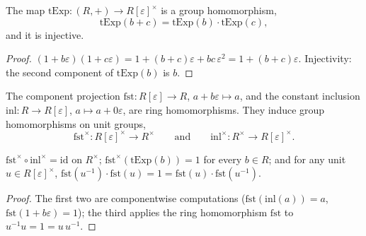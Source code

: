 \begin{lemma}
  \label{lem:truncExp_add}
  \leanok
  The map \(\mathrm{tExp} : (R, +) \to R[\varepsilon]^\times\) is a group homomorphism,
  \[
    \mathrm{tExp}(b + c) = \mathrm{tExp}(b) \cdot \mathrm{tExp}(c),
  \]
  and it is injective.
\end{lemma}
\begin{proof}
  \leanok
  \((1 + b\varepsilon)(1 + c\varepsilon) = 1 + (b + c)\varepsilon +
  bc\,\varepsilon^2 = 1 + (b+c)\varepsilon\). Injectivity: the second component of
  \(\mathrm{tExp}(b)\) is \(b\).
\end{proof}

\begin{definition}
  \label{def:unitsFst}
  \leanok
  The component projection \(\mathrm{fst} : R[\varepsilon] \to R\),
  \(a + b\varepsilon \mapsto a\), and the constant inclusion
  \(\mathrm{inl} : R \to R[\varepsilon]\), \(a \mapsto a + 0\varepsilon\), are ring
  homomorphisms. They induce group homomorphisms on unit groups,
  \[
    \mathrm{fst}^\times : R[\varepsilon]^\times \to R^\times
    \qquad\text{and}\qquad
    \mathrm{inl}^\times : R^\times \to R[\varepsilon]^\times .
  \]
\end{definition}

\begin{lemma}
  \label{lem:unitsFst_split}
  \leanok
  \(\mathrm{fst}^\times \circ \mathrm{inl}^\times = \mathrm{id}\) on \(R^\times\);
  \(\mathrm{fst}^\times(\mathrm{tExp}(b)) = 1\) for every \(b \in R\); and for any unit
  \(u \in R[\varepsilon]^\times\),
  \(\mathrm{fst}(u^{-1}) \cdot \mathrm{fst}(u) = 1 = \mathrm{fst}(u) \cdot
  \mathrm{fst}(u^{-1})\).
\end{lemma}
\begin{proof}
  \leanok
  The first two are componentwise computations
  (\(\mathrm{fst}(\mathrm{inl}(a)) = a\), \(\mathrm{fst}(1 + b\varepsilon) = 1\)); the
  third applies the ring homomorphism \(\mathrm{fst}\) to
  \(u^{-1} u = 1 = u\,u^{-1}\).
\end{proof}

